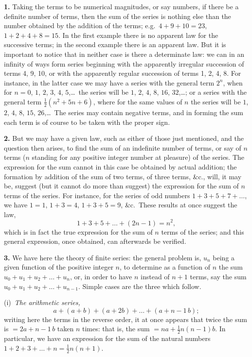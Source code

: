 \documentclass[11pt,a4paper]{article}
\begin{document}
\textbf{1.}\quad
Taking the terms to be numerical magnitudes, or say numbers, if there be a definite number of terms, then the sum of the series is nothing else than the number obtained by the addition of the terms; e.g.\ $4 + 9 + 10 = 23$, $1 + 2 + 4 + 8 = 15$. In the first example there is no apparent law for the successive terms; in the second example there is an apparent law. But it is important to notice that in neither case is there a determinate law: we can in an infinity of ways form series beginning with the apparently irregular succession of terms 4, 9, 10, or with the apparently regular succession of terms 1, 2, 4, 8. For instance, in the latter case we may have a series with the general term $2^{n}$, when for $n = 0$, $1$, $2$, $3$, $4$, $5$,\ldots\ the series will be $1$, $2$, $4$, $8$, $16$, $32$,\ldots; or a series with the general term $\frac{1}{2}(n^{2} + 5n + 6)$, where for the same values of $n$ the series will be $1$, $2$, $4$, $8$, $15$, $26$,\ldots\ The series may contain negative terms, and in forming the sum each term is of course to be taken with the proper sign.

\textbf{2.}\quad
But we may have a given law, such as either of those just mentioned, and the question then arises, to find the sum of an indefinite number of terms, or say of $n$ terms ($n$ standing for any positive integer number at pleasure) of the series. The expression for the sum cannot in this case be obtained by actual addition; the formation by addition of the sum of two terms, of three terms, \&c., will, it may be, suggest (but it cannot do more than suggest) the expression for the sum of $n$ terms of the series. For instance, for the series of odd numbers $1 + 3 + 5 + 7 + \ldots$, we have $1 = 1$, $1 + 3 = 4$, $1 + 3 + 5 = 9$, \&c.\ These results at once suggest the law,
\[
1 + 3 + 5 + \ldots + (2n - 1) = n^{2},
\]
which is in fact the true expression for the sum of $n$ terms of the series; and this general expression, once obtained, can afterwards be verified.

\textbf{3.}\quad
We have here the theory of finite series: the general problem is, $u_{n}$ being a given function of the positive integer $n$, to determine as a function of $n$ the sum $u_{0} + u_{1} + u_{2} + \ldots + u_{n}$, or, in order to have $n$ instead of $n + 1$ terms, say the sum $u_{0} + u_{1} + u_{2} + \ldots + u_{n-1}$. Simple cases are the three which follow.

(i)~\textit{The arithmetic series,}
\[
a + (a + b) + (a + 2b) + \ldots + (a + n - 1\, b);
\]
writing here the terms in the reverse order, it at once appears that twice the sum is $= 2a + n - 1\, b$ taken $n$ times: that is, the sum $= na + \frac{1}{2}n(n - 1)b$. In particular, we have an expression for the sum of the natural numbers $1 + 2 + 3 + \ldots + n = \frac{1}{2}n(n + 1)$.
\end{document}
